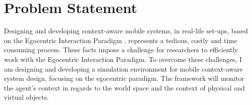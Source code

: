 \section{Problem Statement} %
\label{sec:problem_statement}

Designing and developing context-aware mobile systems, in real-life set-ups, based on the Egocentric Interaction Paradigm \cite{pederson2010towards}, represents a tedious, costly and time consuming process. These facts impose a challenge for researchers to efficiently work with the Egocentric Interaction Paradigm. To overcome these challenges, I am designing and developing a simulation environment for mobile context-aware system design, focusing on the egocentric paradigm. The framework will monitor the agent's context in regards to the world space and the context of physical and virtual objects.\\


